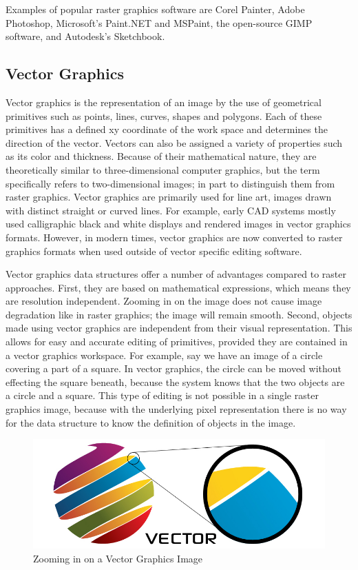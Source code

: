 \documentclass[12pt]{report}
\begin{document}
Examples of popular raster graphics software are Corel Painter, Adobe Photoshop, Microsoft's Paint.NET and MSPaint, the open-source GIMP software, and Autodesk's Sketchbook.

\subsection{Vector Graphics}

Vector graphics is the representation of an image by the use of geometrical primitives such as points, lines, curves, shapes and polygons.
Each of these primitives has a defined xy coordinate of the work space and determines the direction of the vector. 
Vectors can also be assigned a variety of properties such as its color and thickness.
Because of their mathematical nature, they are theoretically similar to three-dimensional computer graphics, but the term specifically refers to two-dimensional images; in part to distinguish them from raster graphics.
Vector graphics are primarily used for line art, images drawn with distinct straight or curved lines.
For example, early CAD systems mostly used calligraphic black and white displays and rendered images in vector graphics formats. However, in modern times, vector graphics are now converted to raster graphics formats when used outside of vector specific editing software.  

Vector graphics data structures offer a number of advantages compared to raster approaches. 
First, they are based on mathematical expressions, which means they are resolution independent.
Zooming in on the image does not cause image degradation like in raster graphics; the image will remain smooth. 
Second, objects made using vector graphics are independent from their visual representation.
This allows for easy and accurate editing of primitives, provided they are contained in a vector graphics workspace.
For example, say we have an image of a circle covering a part of a square. In vector graphics, the circle can be moved without effecting the square beneath, because the system knows that the two objects are a circle and a square.
This type of editing is not possible in a single raster graphics image, because with the underlying pixel representation there is no way for the data structure to know the definition of objects in the image.
 

\begin{figure}
\includegraphics[width=\textwidth]{vector.jpg}
\caption{Zooming in on a Vector Graphics Image}
\end{figure}
\end{document}
